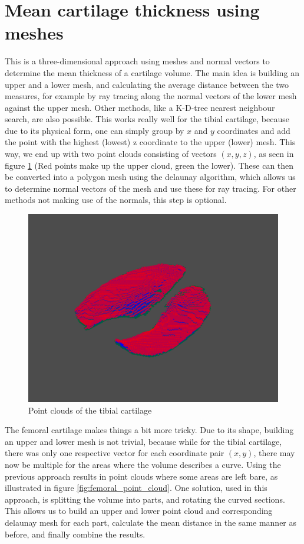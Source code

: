 \section{Mean cartilage thickness using meshes}
This is a three-dimensional approach using meshes and normal vectors to determine the mean thickness of a cartilage volume. The main idea is building an upper and a lower mesh, and calculating the average distance between the two measures, for example by ray tracing along the normal vectors of the lower mesh against the upper mesh. Other methods, like a K-D-tree nearest neighbour search, are also possible. This works really well for the tibial cartilage, because due to its physical form, one can simply group by $x$ and $y$ coordinates and add the point with the highest (lowest) z coordinate to the upper (lower) mesh. This way, we end up with two point clouds consisting of vectors $(x, y, z)$, as seen in figure \ref{fig:tibial_point_cloud} (Red points make up the upper cloud, green the lower). These can then be converted into a polygon mesh using the delaunay algorithm, which allows us to determine normal vectors of the mesh and use these for ray tracing. For other methods not making use of the normals, this step is optional. 
\begin{figure}[htb!]
	\centering
	\includegraphics[width=\linewidth]{./figures/s2}
	\caption{Point clouds of the tibial cartilage}
	\label{fig:tibial_point_cloud}
\end{figure}
\par
The femoral cartilage makes things a bit more tricky. Due to its shape, building an upper and lower mesh is not trivial, because while for the tibial cartilage, there was only one respective vector for each coordinate pair $(x, y)$, there may now be multiple for the areas where the volume describes a curve. Using the previous approach results in point clouds where some areas are left bare, as illustrated in figure \ref{fig:femoral_point_cloud}. One solution, used in this approach, is splitting the volume into parts, and rotating the curved sections. This allows us to build an upper and lower point cloud and corresponding delaunay mesh for each part, calculate the mean distance in the same manner as before, and finally combine the results.
